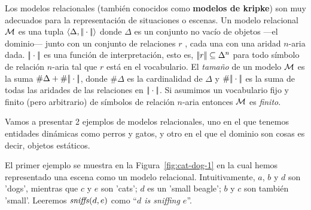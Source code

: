 Los modelos relacionales (tambi\'en conocidos como \textbf{modelos de kripke}) son muy adecuados para la representaci\'on de situaciones o escenas. Un modelo relacional $\mathcal{M}$ es una tupla $\langle \Delta,|\!|\cdot|\!| \rangle$ donde $\Delta$ es un conjunto no vac\'io de objetos ---el dominio--- junto con un conjunto de relaciones $r$ , cada una con una aridad $n$-aria dada. $|\!|\cdot|\!|$ es una funci\'on de interpretaci\'on, esto es,
$|\!|r|\!| \subseteq \Delta^n$ para todo s\'imbolo de relaci\'on $n$-aria tal que
$r$ est\'a en el vocabulario.  El \emph{tama\~no} de un modelo $\mathcal{M}$ es la suma
$\#\Delta + \#|\!|\cdot|\!|$, donde $\#\Delta$ es la cardinalidad
de $\Delta$ y $\#|\!|\cdot|\!|$ es la suma de todas las aridades de las
relaciones en $|\!|\cdot|\!|$.
Si asumimos un vocabulario fijo y finito (pero arbitrario) de
s\'imbolos de relaci\'on $n$-aria entonces $\mathcal{M}$ es \emph{finito}. 



Vamos a presentar 2 ejemplos de modelos relacionales, uno en el que tenemos entidades din\'amicas como perros y gatos, y otro en el que el dominio son cosas es decir, objetos est\'aticos.

El primer ejemplo se muestra en la Figura~\ref{fig:cat-dog-1} en la cual hemos representado una escena
como un modelo relacional. Intuitivamente, $a$, $b$ y $d$ son 'dogs', mientras que 
$c$ y $e$ son 'cats';  $d$ es un 'small beagle';
 $b$ y $c$ son tambi\'en 'small'.
 Leeremos $\mathit{sniffs}(d,e)$ como ``{\em $d$ is sniffing $e$}''.


